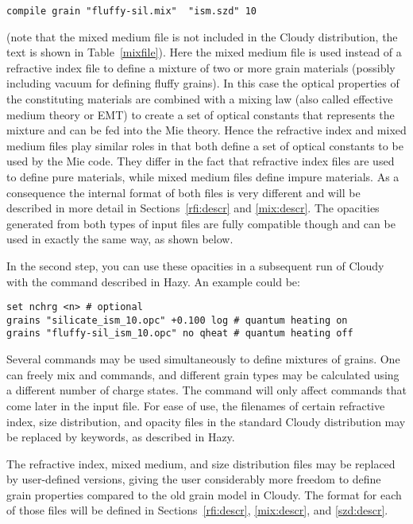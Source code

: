 \begin{verbatim}
compile grain "fluffy-sil.mix"  "ism.szd" 10
\end{verbatim}

\noindent (note that the mixed medium file  is not
included in the Cloudy distribution, the text is shown in
Table~\ref{mixfile}). Here the mixed medium file is used instead of a
refractive index file to define a mixture of two or more grain materials
(possibly including vacuum for defining fluffy grains). In this case the
optical properties of the constituting materials are combined with a mixing
law (also called effective medium theory or EMT) to create a set of optical
constants that represents the mixture and can be fed into the Mie theory.
Hence the refractive index and mixed medium files play similar roles in that
both define a set of optical constants to be used by the Mie code. They differ
in the fact that refractive index files are used to define pure materials,
while mixed medium files define impure materials. As a consequence the
internal format of both files is very different and will be described in more
detail in Sections~\ref{rfi:descr} and \ref{mix:descr}. The opacities
generated from both types of input files are fully compatible though and can
be used in exactly the same way, as shown below.

In the second step, you can use these opacities in a subsequent run of Cloudy
with the  command described in Hazy. An example could be:

\begin{verbatim}
set nchrg <n> # optional
grains "silicate_ism_10.opc" +0.100 log # quantum heating on
grains "fluffy-sil_ism_10.opc" no qheat # quantum heating off
\end{verbatim}

Several  commands may be used simultaneously to define
mixtures of grains. One can freely mix  and
 commands, and different grain types may be calculated using
a different number of charge states. The  command will
only affect  commands that come later in the input file. For
ease of use, the filenames of certain refractive index, size distribution, and
opacity files in the standard Cloudy distribution may be replaced by keywords,
as described in Hazy.


The refractive index, mixed medium, and size distribution files may be
replaced by user-defined versions, giving the user considerably more freedom
to define grain properties compared to the old grain model in Cloudy. The
format for each of those files will be defined in Sections~\ref{rfi:descr},
\ref{mix:descr}, and \ref{szd:descr}.

